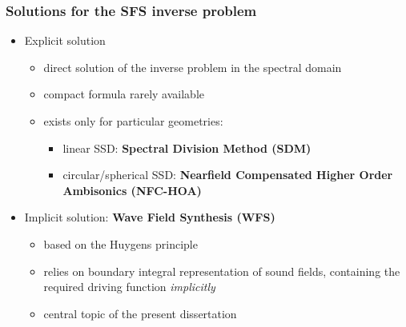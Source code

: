 \documentclass{beamer}
\begin{document}
\begin{frame}
\frametitle{Solutions for the SFS inverse problem}
\begin{itemize}
\item Explicit solution
		\begin{itemize}
		\item direct solution of the inverse problem in the spectral domain \vspace{2mm} 
		\item compact formula rarely available \vspace{2mm}
		\item exists only for particular geometries:
		\begin{itemize}
			\vspace{2mm}
			\item linear SSD: \textbf{Spectral Division Method (SDM)}
			\vspace{2mm}
			\item circular/spherical SSD: \textbf{Nearfield Compensated Higher Order Ambisonics (NFC-HOA)}
		\end{itemize}
		\end{itemize}
	\vspace{5mm}
	\item Implicit solution: \textbf{Wave Field Synthesis (WFS)}
		\begin{itemize}
		\item based on the Huygens principle \vspace{2mm}
		\item relies on boundary integral representation of sound fields, containing the required driving function \emph{implicitly}\vspace{2mm}
		\item central topic of the present dissertation
		\end{itemize}
		\vspace{5mm}
\end{itemize}
\end{frame}
\end{document}
